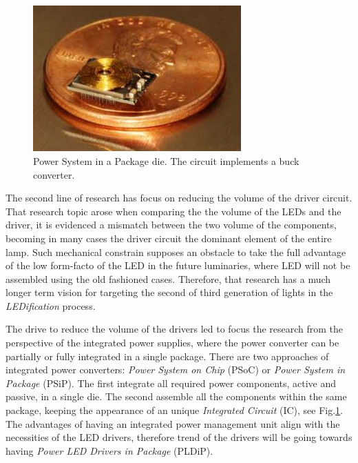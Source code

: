 \begin{figure}[!h]
\centering
\includegraphics[width=8cm]{./0_intro/img/FSolzbacher01.jpg}
\caption{Power System in a Package die. The circuit implements a buck converter.}
\label{fig:psoc_example}
\end{figure}

\vspace{5mm} %

The second line of research has focus on reducing the volume of the driver circuit. That research topic arose when comparing the the volume of the LEDs and the driver, it is evidenced a mismatch between the two volume of the components, becoming in many cases the driver circuit the dominant element of the entire lamp. Such mechanical constrain supposes an obstacle to take the full advantage of the low form-facto of the LED in the future luminaries, where LED will not be assembled using the old fashioned cases. Therefore, that research has a much longer term vision for targeting the second of third generation of lights in the \emph{LEDification} process.

The drive to reduce the volume of the drivers led to focus the research from the perspective of the integrated power supplies, where the power converter can be partially or fully integrated in a single package. There are two approaches of integrated power converters: \emph{Power System on Chip} (PSoC) or  \emph{Power System in Package} (PSiP). The first integrate all required power components, active and passive, in a single die. The second assemble all the components within the same package, keeping the appearance of an unique \emph{Integrated Circuit} (IC), see Fig.\ref{fig:psoc_example}. The advantages of having an integrated power management unit align with the necessities of the LED drivers, therefore trend of the drivers will be going towards having \emph{Power LED Drivers in Package} (PLDiP).

